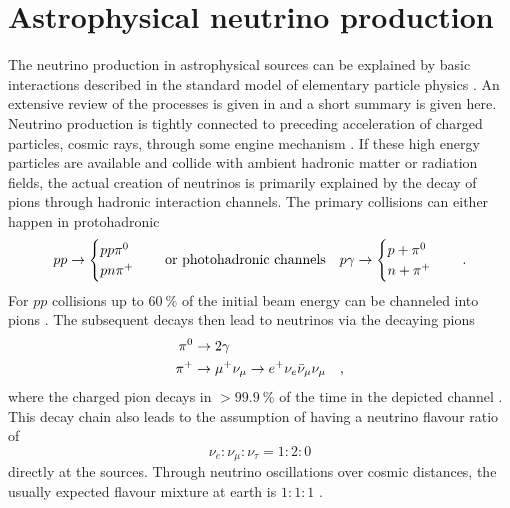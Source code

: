 \section{Astrophysical neutrino production}
The neutrino production in astrophysical sources can be explained by basic interactions described in the standard model of elementary particle physics .
An extensive review of the processes is given in  and a short summary is given here.
Neutrino production is tightly connected to preceding acceleration of charged particles, cosmic rays, through some engine mechanism .
If these high energy particles are available and collide with ambient hadronic matter or radiation fields, the actual creation of neutrinos is primarily explained by the decay of pions through hadronic interaction channels.
The primary collisions can either happen in protohadronic
\begin{equation}
  p p \rightarrow
    \begin{cases}
      p p \pi^0 \\
      p n \pi^+
    \end{cases}
    \quad\text{or photohadronic channels}\quad
  p \gamma \rightarrow
    \begin{cases}
      p + \pi^0 \\
      n + \pi^+
    \end{cases}
  \quad\text{.}
\end{equation}
For $pp$ collisions up to $\SI{60}{\percent}$ of the initial beam energy can be channeled into pions .
The subsequent decays then lead to neutrinos via the decaying pions
\begin{align}
  \pi^0 &\rightarrow 2\gamma \\
  \pi^+ &\rightarrow \mu^+ \nu_\mu \rightarrow e^+ \nu_e \bar{\nu}_\mu \nu_\mu
  \quad\text{,}
\end{align}
where the charged pion decays in $>\SI{99,9}{\percent}$ of the time in the depicted channel .
This decay chain also leads to the assumption of having a neutrino flavour ratio of
\begin{equation}
  \nu_e : \nu_\mu : \nu_\tau = 1 : 2 : 0
\end{equation}
directly at the sources.
Through neutrino oscillations over cosmic distances, the usually expected flavour mixture at earth is $1:1:1$ .

